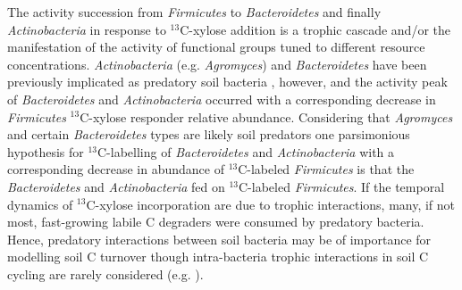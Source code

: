 The activity succession from \textit{Firmicutes} to \textit{Bacteroidetes} and
finally \textit{Actinobacteria} in response to $^{13}$C-xylose addition is
a trophic cascade and/or the manifestation of the activity of functional
groups tuned to different resource concentrations. \textit{Actinobacteria}
(e.g. \textit{Agromyces}) and \textit{Bacteroidetes} have been previously
implicated as predatory soil bacteria \citep{Lueders2006,16346402}, however,
and the activity peak of \textit{Bacteroidetes} and \textit{Actinobacteria}
occurred with a corresponding decrease in \textit{Firmicutes} $^{13}$C-xylose
responder relative abundance. Considering that \textit{Agromyces} and certain
\textit{Bacteroidetes} types are likely soil predators  one parsimonious
hypothesis for $^{13}$C-labelling of \textit{Bacteroidetes} and
\textit{Actinobacteria} with a corresponding decrease in abundance of
$^{13}$C-labeled \textit{Firmicutes} is that the \textit{Bacteroidetes} and
\textit{Actinobacteria} fed on $^{13}$C-labeled \textit{Firmicutes}. If the
temporal dynamics of $^{13}$C-xylose incorporation are due to trophic
interactions, many, if not most, fast-growing labile C degraders were consumed
by predatory bacteria. Hence, predatory interactions between soil bacteria may
be of importance for modelling soil C turnover though intra-bacteria trophic
interactions in soil C cycling are rarely considered (e.g.
\citep{Moore1988}).

